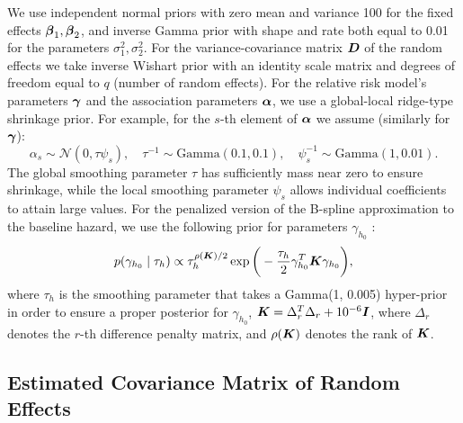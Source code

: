 We use independent normal priors with zero mean and variance 100 for the fixed effects $\boldsymbol{\beta}_1, \boldsymbol{\beta}_2$, and inverse Gamma prior with shape and rate both equal to 0.01 for the parameters $\sigma_1^2, \sigma_2^2$. For the variance-covariance matrix $\boldsymbol{D}$ of the random effects we take inverse Wishart prior with an identity scale matrix and degrees of freedom equal to $q$ (number of random effects). For the relative risk model's parameters $\boldsymbol{\gamma}$ and the association parameters $\boldsymbol{\alpha}$, we use a global-local ridge-type shrinkage prior. For example, for the $s$-{th} element of $\boldsymbol{\alpha}$ we assume (similarly for $\boldsymbol{\gamma}$):
\begin{equation*} 
\alpha_s \sim \mathcal{N}(0, \tau\psi_s), \quad \tau^{-1} \sim \mbox{Gamma}(0.1, 0.1),  \quad \psi_s^{-1} \sim \mbox{Gamma}(1, 0.01).
\end{equation*} 
The global smoothing parameter $\tau$ has sufficiently mass near zero to ensure shrinkage, while the local smoothing parameter $\psi_s$ allows individual coefficients to attain large values. For the penalized version of the B-spline approximation to the baseline hazard, we use the following prior for parameters $\gamma_{h_0}$ \citep{lang2004bayesian}:
\begin{equation*}
p(\gamma_{h_0} \mid \tau_h) \propto \tau_h^{\rho(\boldsymbol{K})/2} \exp\bigg(-\frac{\tau_h}{2}\gamma_{h_0}^T \boldsymbol{K} \gamma_{h_0}\bigg),
\end{equation*}
where $\tau_h$ is the smoothing parameter that takes a Gamma(1, 0.005) hyper-prior in order to ensure a proper posterior for $\gamma_{h_0}$, $\boldsymbol{K} = \Delta_r^T \Delta_r + 10^{-6} \boldsymbol{I}$, where $\Delta_r$ denotes the $r$-th difference penalty matrix, and $\rho(\boldsymbol{K})$ denotes the rank of $\boldsymbol{K}$.

\clearpage
\subsection{Estimated Covariance Matrix of Random Effects}
\label{suppl : estimated_cov}

